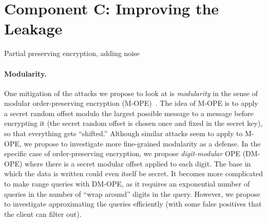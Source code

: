 \section{Component C: Improving the Leakage}

Partial preserving encryption, adding noise

\paragraph*{Modularity.}  One mitigation of the attacks we propose to look at is \emph{modularity} in the sense of modular order-preserving encryption (M-OPE)~\cite{C:BolCheOne11}.  The idea of M-OPE is to apply a secret random offset modulo the largest possible message to a message before encrypting it (the secret random offset is chosen once and fixed in the secret key), so that everything gets ``shifted.''  Although similar attacks seem to apply to M-OPE, we propose to investigate more fine-grained modularity as a defense.  In the specific case of order-preserving encryption, we propose \emph{digit-modular} OPE (DM-OPE) where there is a secret modular offset applied to each digit.  The base in which the data is written could even itself be secret.  It becomes more complicated to make range queries with DM-OPE, as it requires an exponential number of queries in the number of ``wrap around'' digits in the query.  However, we propose to investigate approximating the queries efficiently (with some false positives that the client can filter out).